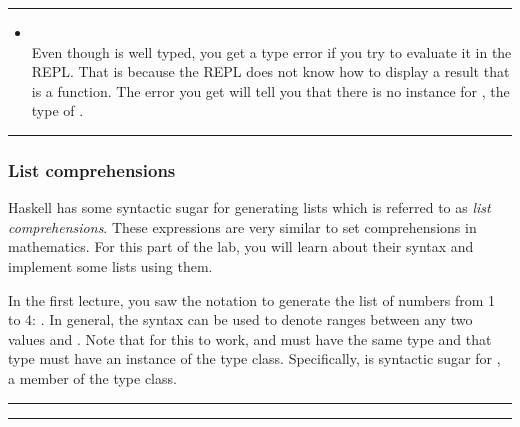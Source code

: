 \bigskip
\hrule
\bigskip
{}
\begin{itemize}
\item {} \\
Even though  is well typed, you get a type error if you try to evaluate it in the REPL. That is because the REPL does not know how to display a result that is a function. The error you get will tell you that there is no  instance for , the type of . 
\end{itemize}
\bigskip
\hrule
\bigskip

\subsubsection{List comprehensions}

Haskell has some syntactic sugar for generating lists which is referred to as \emph{list comprehensions}. These expressions are very similar to set comprehensions in mathematics. For this part of the lab, you will learn about their syntax and implement some lists using them.

In the first lecture, you saw the \haskellIn{[1..4]} notation to generate the list of numbers from 1 to 4: \haskellIn{[1,2,3,4]}. In general, the \haskellIn{[n..m]} syntax can be used to denote ranges between any two values  and . Note that for this to work,  and  must have the same type and that type must have an instance of the  type class. Specifically, \haskellIn{[n..m]} is syntactic sugar for , a member of the  type class.

\bigskip
\hrule
\bigskip


\bigskip
\hrule
\bigskip


